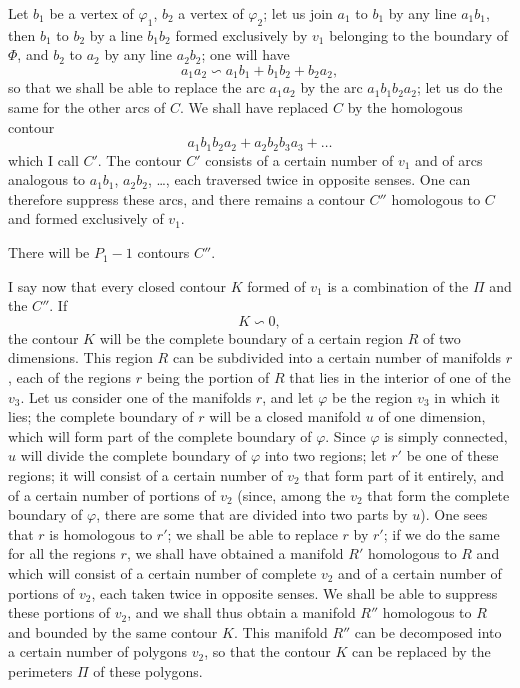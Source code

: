 \documentclass{article}
\begin{document}
Let $b_{1}$ be a vertex of $\varphi_{1}$, $b_{2}$ a vertex of $\varphi_{2}$; let us join $a_{1}$ to $b_{1}$ by
any line $a_{1}b_{1}$, then $b_{1}$ to $b_{2}$ by a line $b_{1}b_{2}$ formed exclusively by $v_{1}$ belonging to the boundary of $\Phi$, and $b_{2}$ to $a_{2}$ by any line $a_{2}b_{2}$; one will have
\[ a_{1}a_{2} \backsim a_{1}b_{1} + b_{1}b_{2} + b_{2}a_{2}, \]
so that we shall be able to replace the arc $a_{1}a_{2}$ by the arc $a_{1}b_{1}b_{2}a_{2}$; let us do the same for the other arcs of $C$. We shall have replaced $C$ by the homologous contour
\[ a_{1}b_{1}b_{2}a_{2} + a_{2}b_{2}b_{3}a_{3} + \ldots \]
which I call $C'$. The contour $C'$ consists of a certain number of $v_{1}$ and of arcs analogous to $a_{1}b_{1}$, $a_{2}b_{2}$, \ldots, each traversed twice in opposite senses. One can therefore suppress these arcs, and there remains a contour $C''$ homologous to $C$ and formed exclusively of $v_{1}$.

There will be $P_{1} - 1$ contours $C''$.

I say now that every closed contour $K$ formed of $v_{1}$ is a combination of the $\Pi$ and the $C''$. If
\[ K \backsim 0, \]
the contour $K$ will be the complete boundary of a certain region $R$ of two dimensions. This region $R$ can be subdivided into a certain number of manifolds $r$, each of the regions $r$ being the portion of $R$ that lies in the interior of one of the $v_{3}$. Let us consider one of the manifolds $r$, and let $\varphi$ be the region $v_{3}$ in which it lies; the complete boundary of $r$ will be a closed manifold $u$ of one dimension, which will form part of the complete boundary of $\varphi$. Since $\varphi$ is simply connected, $u$ will divide the complete boundary of $\varphi$ into two regions; let $r'$ be one of these regions; it will consist of a certain number of $v_{2}$ that form part of it entirely, and of a certain number of portions of $v_{2}$ (since, among the $v_{2}$ that form the complete boundary of $\varphi$, there are some that are divided into two parts by $u$). One sees that $r$ is homologous to $r'$; we shall be able to replace $r$ by $r'$; if we do the same for all the regions $r$, we shall have obtained a manifold
$R'$ homologous to $R$ and which will consist of a certain number of complete $v_{2}$ and of a certain number of portions of $v_{2}$, each taken twice in opposite senses. We shall be able to suppress these portions of $v_{2}$, and we shall thus obtain a manifold $R''$ homologous to $R$ and bounded by the same contour $K$. This manifold $R''$ can be decomposed into a certain number of polygons $v_{2}$, so that the contour $K$ can be replaced by the perimeters $\Pi$ of these polygons.
\end{document}
